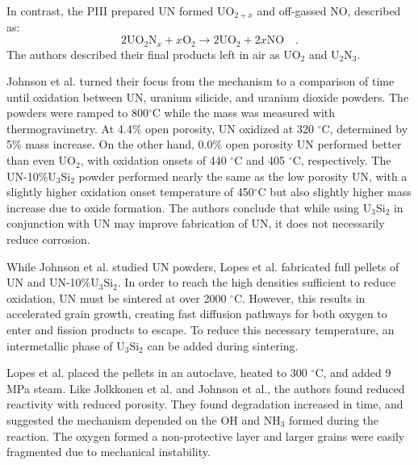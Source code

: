 \documentclass[11pt]{article}
\begin{document}
\begin{multicols}{2}
In contrast, the PIII prepared UN formed UO$_{2+x}$ and off-gassed NO, described as:
\begin{equation}
2\mbox{UO}_{2}\mbox{N}_{x} + x\mbox{O}_{2} \rightarrow 2 \mbox{UO}_{2} + 2x\mbox{NO} \quad .
\end{equation}
The authors described their final products left in air as UO$_{2}$ and U$_{2}$N$_{3}$.
\par 
Johnson et al. \cite{Johnson2016} turned their focus from the mechanism to a comparison of time until oxidation between UN, uranium silicide, and uranium dioxide powders. The powders were ramped to 800$^{\circ}$C while the mass was measured with thermogravimetry. At 4.4\% open porosity, UN oxidized at 320 $^{\circ}$C, determined by 5\% mass increase. On the other hand, 0.0\% open porosity UN performed better than even UO$_{2}$, with oxidation onsets of 440 $^{\circ}$C and 405 $^{\circ}$C, respectively. The UN-10\%U$_{3}$Si$_{2}$ powder performed nearly the same as the low porosity UN, with a slightly higher oxidation onset temperature of 450$^{\circ}$C but also slightly higher mass increase due to oxide formation. The authors conclude that while using U$_{3}$Si$_{2}$ in conjunction with UN may improve fabrication of UN, it does not necessarily reduce corrosion.
\par 
 While Johnson et al. studied UN powders, Lopes et al. \cite{Lopes2017}  fabricated full pellets of UN and UN-10\%U$_{3}$Si$_{2}$. In order to reach the high densities sufficient to reduce oxidation, UN must be sintered at over 2000 $^{\circ}$C. However, this results in accelerated grain growth, creating fast diffusion pathways for both oxygen to enter and fission products to escape. To reduce this necessary temperature, an intermetallic phase of U$_{3}$Si$_{2}$ can be added during sintering.
\par 
Lopes et al. placed the pellets in an autoclave, heated to 300 $^{\circ}$C, and added 9 MPa steam. Like Jolkkonen et al. and Johnson et al., the authors found reduced reactivity with reduced porosity. They found degradation increased in time, and suggested the mechanism depended on the OH and NH$_{3}$ formed during the reaction. The oxygen formed a non-protective layer and larger grains were easily fragmented due to mechanical instability.


\end{multicols}
\end{document}
